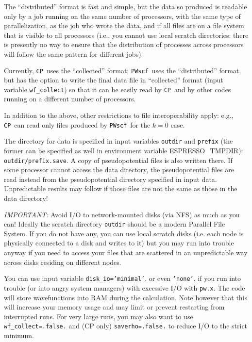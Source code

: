 \documentclass[12pt,a4paper]{article}
\def\pwx{\texttt{pw.x}}
\def\PWscf{\texttt{PWscf}}
\def\CP{\texttt{CP}}
\begin{document}
The ``distributed'' format is fast and simple,
but the data so produced is readable only by 
a job running on the same number of processors,
with the same type of parallelization, as the
job who wrote the data, and if all 
files are on a file system that is visible to all
processors (i.e., you cannot use local scratch
directories: there is presently no way to ensure 
that the distribution of processes across
processors will follow the same pattern 
for different jobs). 

Currently, \CP\ uses the ``collected'' format;
\PWscf\ uses the ``distributed'' format, but 
has the option to write the final data file in 
``collected'' format (input variable \texttt{wf\_collect})
so that it can be easily read by \CP\ and by other
codes running on a different  number of processors.

In addition to the above, other restrictions to file
interoperability apply: e.g., \CP\ can read only files
produced by \PWscf\ for the $k=0$ case. 

The directory for data is specified in input variables
\texttt{outdir} and \texttt{prefix} (the former can be specified
as well in environment variable ESPRESSO\_TMPDIR):
\texttt{outdir/prefix.save}. A copy of pseudopotential files
is also written there. If some processor cannot access the
data directory, the pseudopotential files are read instead
from the pseudopotential directory specified in input data.
Unpredictable results may follow if those files
are not the same as those in the data directory!

{\em IMPORTANT:}
Avoid I/O to network-mounted disks (via NFS) as much as you can! 
Ideally the scratch directory \texttt{outdir} should be a modern 
Parallel File System. If you do not have any, you can use local
scratch disks (i.e. each node is physically connected to a disk
and writes to it) but you may run into trouble anyway if you 
need to access your files that are scattered in an unpredictable
way across disks residing on different nodes.

You can use input variable \texttt{disk\_io='minimal'}, or even 
\texttt{'none'}, if you run
into trouble (or into angry system managers) with excessive I/O with \pwx. 
The code will store wavefunctions into RAM during the calculation.
Note however that this will increase your memory usage and may limit 
or prevent restarting from interrupted runs. For very large runs,
you may also want to use \texttt{wf\_collect=.false.} and (CP only)
\texttt{saverho=.false.} to reduce I/O to the strict minimum.
\end{document}
